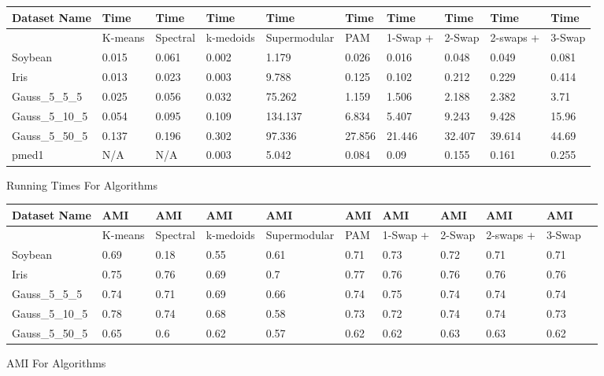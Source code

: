 \documentclass{article}
\begin{document}
\begin{figure*}[h]
\begin{tabular}{ | l | l | l | l | l | l | l | l | l | l | }
\hline
	Dataset Name & Time & Time & Time & Time & Time & Time & Time & Time & Time \\ \hline
	&K-means & Spectral & k-medoids & Supermodular & PAM & 1-Swap + & 2-Swap & 2-swaps + & 3-Swap  \\ \hline
	Soybean & 0.015 & 0.061 & 0.002 & 1.179 & 0.026 & 0.016 & 0.048 & 0.049 & 0.081 \\ 
	Iris & 0.013 & 0.023 & 0.003 & 9.788 & 0.125 & 0.102 & 0.212 & 0.229 & 0.414 \\ 
	Gauss\_5\_5\_5 & 0.025 & 0.056 & 0.032 & 75.262 & 1.159 & 1.506 & 2.188 & 2.382 & 3.71 \\ 
	Gauss\_5\_10\_5 & 0.054 & 0.095 & 0.109 & 134.137 & 6.834 & 5.407 & 9.243 & 9.428 & 15.96 \\ 
	Gauss\_5\_50\_5 & 0.137 & 0.196 & 0.302 & 97.336 & 27.856 & 21.446 & 32.407 & 39.614 & 44.69 \\ 
	pmed1 & N/A & N/A & 0.003 & 5.042 & 0.084 & 0.09 & 0.155 & 0.161 & 0.255 \\ \hline
\end{tabular}

\caption{Running Times For Algorithms}
\end{figure*}

\begin{figure*}[h]
\begin{tabular}{ | l | l | l | l | l | l | l | l | l | l | l | }
\hline
	Dataset Name & AMI & AMI & AMI & AMI & AMI & AMI & AMI & AMI & AMI  \\ \hline
	& K-means & Spectral & k-medoids & Supermodular & PAM & 1-Swap + & 2-Swap & 2-swaps + & 3-Swap   \\ \hline
	Soybean & 0.69 & 0.18 & 0.55 & 0.61 & 0.71 & 0.73 & 0.72 & 0.71 & 0.71  \\ 
	Iris & 0.75 & 0.76 & 0.69 & 0.7 & 0.77 & 0.76 & 0.76 & 0.76 & 0.76  \\ 
	Gauss\_5\_5\_5 & 0.74 & 0.71 & 0.69 & 0.66 & 0.74 & 0.75 & 0.74 & 0.74 & 0.74  \\ 
	Gauss\_5\_10\_5 & 0.78 & 0.74 & 0.68 & 0.58 & 0.73 & 0.72 & 0.74 & 0.74 & 0.73  \\ 
	Gauss\_5\_50\_5 & 0.65 & 0.6 & 0.62 & 0.57 & 0.62 & 0.62 & 0.63 & 0.63 & 0.62  \\ \hline
\end{tabular}


\caption{AMI For Algorithms}
\end{figure*}
\end{document}
